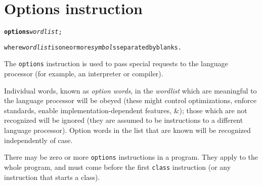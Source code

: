 \chapter{Options instruction}\label{"id"}
\begin{shaded}
\begin{alltt}
\textbf{options} \emph{wordlist};

where \emph{wordlist} is one or more \emph{symbol}s separated by blanks.
\end{alltt}
\end{shaded}
 
The \texttt{options} instruction is used to pass special requests to
the language processor (for example, an interpreter or compiler).
 
Individual words, known as \emph{option words}, in the
\emph{wordlist} which are meaningful to the language processor will
be obeyed (these might control optimizations, enforce standards, enable
implementation-dependent features, \&); those which are not
recognized will be ignored (they are assumed to be instructions to a
different language processor).
Option words in the list that are known will be recognized independently
of case.
 
There may be zero or more \texttt{options} instructions in a program.
They apply to the whole program, and must come before the first
\texttt{class} instruction (or any instruction that starts a class).
 
